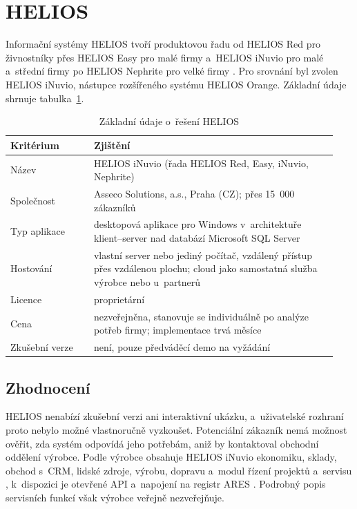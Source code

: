 \section{HELIOS}\label{sec:reserse-helios}

Informační systémy HELIOS tvoří produktovou řadu od HELIOS Red pro živnostníky přes HELIOS Easy pro malé firmy a~HELIOS iNuvio pro malé a~střední firmy po HELIOS Nephrite pro velké firmy \cite{autoerp-srovnani}. Pro srovnání byl zvolen HELIOS iNuvio, nástupce rozšířeného systému HELIOS Orange. Základní údaje shrnuje tabulka~\ref{tab:reserse-helios}.

\begin{table}[H]
\centering
\small
\begin{tabular}{>{\raggedright\arraybackslash}p{0.24\linewidth}>{\raggedright\arraybackslash}p{0.70\linewidth}}
\hline
\textbf{Kritérium} & \textbf{Zjištění} \\
\hline
Název & HELIOS iNuvio (řada HELIOS Red, Easy, iNuvio, Nephrite) \\
Společnost & Asseco Solutions, a.s., Praha (CZ); přes 15~000 zákazníků \cite{helios-fenix-pl} \\
Typ aplikace & desktopová aplikace pro Windows v~architektuře klient--server nad databází Microsoft SQL Server \cite{helios-pozadavky} \\
Hostování & vlastní server nebo jediný počítač, vzdálený přístup přes vzdálenou plochu; cloud jako samostatná služba výrobce nebo u~partnerů \cite{helios-pozadavky,helios-inuvio,appon-inuvio} \\
Licence & proprietární \\
Cena & nezveřejněna, stanovuje se individuálně po analýze potřeb firmy; implementace trvá měsíce \cite{helios-inuvio,autoerp-srovnani} \\
Zkušební verze & není, pouze předváděcí demo na vyžádání \cite{helios-inuvio} \\
\hline
\end{tabular}
\caption{Základní údaje o~řešení HELIOS}\label{tab:reserse-helios}
\end{table}

\subsection{Zhodnocení}

HELIOS nenabízí zkušební verzi ani interaktivní ukázku, a~uživatelské rozhraní proto nebylo možné vlastnoručně vyzkoušet. Potenciální zákazník nemá možnost ověřit, zda systém odpovídá jeho potřebám, aniž by kontaktoval obchodní oddělení výrobce. Podle výrobce obsahuje HELIOS iNuvio ekonomiku, sklady, obchod s~CRM, lidské zdroje, výrobu, dopravu a~modul řízení projektů a~servisu \cite{helios-inuvio}, k~dispozici je otevřené API a~napojení na registr ARES \cite{ucetnictvi-inuvio}. Podrobný popis servisních funkcí však výrobce veřejně nezveřejňuje.

